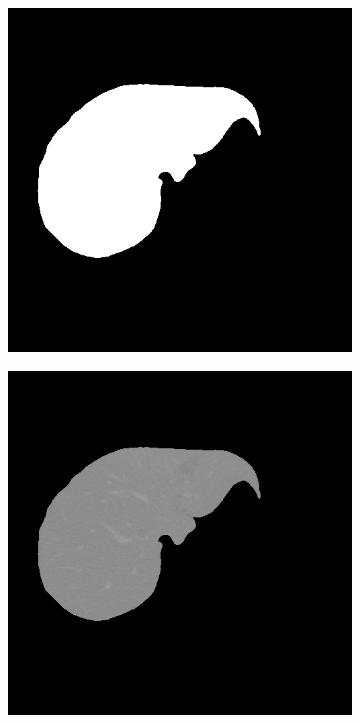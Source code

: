 \begin{figure}[h!]
\begin{subfigure}[b]{0.24\textwidth}
			\includegraphics[width=\textwidth]{figures/pre_processing_extract_liver}
			\caption{}
			\label{fig:pre_processing_extract_liver}
		\end{subfigure}
		\hfill
		\begin{subfigure}[b]{0.24\textwidth}
			\includegraphics[width=\textwidth]{figures/pre_processing_extract_crop}

\end{subfigure}
\end{figure}
